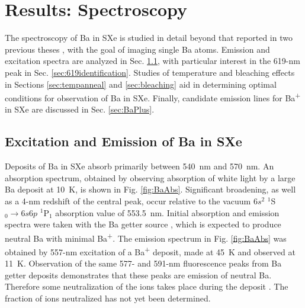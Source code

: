 \chapter{Results: Spectroscopy}
\label{chapter:spectroscopy}

The spectroscopy of Ba in SXe is studied in detail beyond that reported in two previous theses \cite{Shon,Brian}, with the goal of imaging single Ba atoms.  Emission and excitation spectra are analyzed in Sec. \ref{sec:fluorescence}, with particular interest in the 619-nm peak in Sec. \ref{sec:619identification}.  Studies of temperature and bleaching effects in Sections \ref{sec:tempanneal} and \ref{sec:bleaching} aid in determining optimal conditions for observation of Ba in SXe.  Finally, candidate emission lines for Ba\textsuperscript{+} in SXe are discussed in Sec. \ref{sec:BaPlus}.


\section{Excitation and Emission of Ba in SXe}
\label{sec:fluorescence}

Deposits of Ba in SXe absorb primarily between 540~nm and 570~nm.  An absorption spectrum, obtained by observing absorption of white light by a large Ba deposit at 10~K, is shown in Fig. \ref{fig:BaAbs}.  Significant broadening, as well as a 4-nm redshift  of the central peak, occur relative to the vacuum $6s^{2}$ $^{1}$S$_{0} \rightarrow 6s6p$ $^{1}$P$_{1}$ absorption value of 553.5~nm.  Initial absorption and emission spectra were taken with the Ba getter source \cite{Mong2015,Shon,Brian}, which is expected to produce neutral Ba with minimal Ba\textsuperscript{+}.  The emission spectrum in Fig. \ref{fig:BaAbs} was obtained by 557-nm excitation of a Ba\textsuperscript{+} deposit, made at 45~K and observed at 11~K.  Observation of the same 577- and 591-nm fluorescence peaks from Ba getter deposits demonstrates that these peaks are emission of neutral Ba.  Therefore some neutralization of the ions takes place during the deposit \cite{Mong2015,Shon,Brian}.  The fraction of ions neutralized has not yet been determined.

